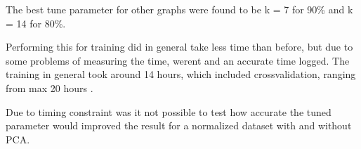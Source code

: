 The best tune parameter for other graphs were found to be k = 7 for 90\% and k = 14 for 80\%.



Performing this for training did in general take less time than before, but due to some problems of measuring the time, werent and an accurate time logged.  The training in general took around 14 hours, which included crossvalidation, ranging from max 20 hours . 

Due to timing constraint was it not possible to test how accurate the tuned parameter would improved the result for a normalized dataset with and without PCA. 

